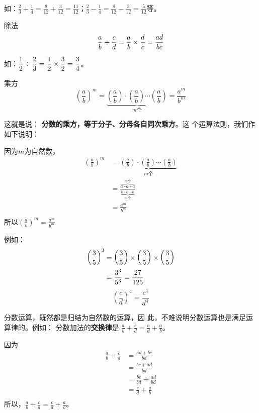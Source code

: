 如：$\frac{2}{3}+\frac{1}{4}=\frac{8}{12}+\frac{3}{12}=\frac{11}{12}$；$\frac{2}{3}-\frac{1}{4}=\frac{8}{12}-\frac{3}{12}=\frac{5}{12}$等。

\begin{blk}{除法}
    \[\dfrac{a}{b}\div \dfrac{c}{d}=\dfrac{a}{b}\times\dfrac{d}{c}=\dfrac{ad}{bc}\]
\end{blk}

如：$\dfrac{1}{2}\div\dfrac{2}{3}=\dfrac{1}{2}\times \dfrac{3}{2}=\dfrac{3}{4}$。

\begin{blk}{乘方}
    \[\left(\frac{a}{b}\right)^m=\underbrace{\left(\frac{a}{b}\right)\cdot \left(\frac{a}{b}\right)\cdots \left(\frac{a}{b}\right)}_{\text{$m$个}}=\frac{a^m}{b^m}\]
\end{blk}

这就是说：
\textbf{分数的乘方，等于分子、分母各自同次乘方}。这
个运算法则，我们作如下说明：

\begin{note}
    因为$m$为自然数，
\begin{align*}
    \left(\frac{a}{b}\right)^m&=\underbrace{\left(\frac{a}{b}\right)\cdot \left(\frac{a}{b}\right)\cdots \left(\frac{a}{b}\right)}_{\text{$m$个}}
 \tag{乘方的意义}\\
&=\frac{\overbrace{a\cdot a\cdots a}^{\text{$m$个}}}{\underbrace{b\cdot b\cdots b}_{\text{$m$个}}} \tag{分数乘法法则}\\
&= \frac{a^m}{b^m}\tag{乘方的意义}\\
\end{align*}
所以$\left(\frac{a}{b}\right)^m=\frac{a^m}{b^m}$
\end{note}

例如：
\[ \begin{split}
    \left(\dfrac{3}{5}\right)^3&=\left(\dfrac{3}{5}\right)\times \left(\dfrac{3}{5}\right)\times \left(\dfrac{3}{5}\right)\\
    &=\dfrac{3^3}{5^3}=\dfrac{27}{125}
\end{split} \]
\[ \left(\frac{c}{d}\right)^4=\frac{c^4}{d^4} \]

分数运算，既然都是归结为自然数的运算，因
此，不难说明分数运算也是满足运算律的。例如：
分数加法的\textbf{交换律}是
$\frac{a}{b}+\frac{c}{d}=\frac{c}{d}+\frac{a}{b}$。

\begin{note}
    因为
    \begin{align*}
        \frac{a}{b}+\frac{c}{d}&=\frac{ad+bc}{bd} \tag{分数加法法则}\\
        &=\frac{bc+ad}{bd}\tag{自然数加法交换律}\\
        &=\frac{bc}{bd}+\frac{ad}{bd}\\
        &=\frac{c}{d}+\frac{a}{b}\tag{分数的基本性质}\\
    \end{align*}
    所以，$\frac{a}{b}+\frac{c}{d}=\frac{c}{d}+\frac{a}{b}$。
\end{note}

